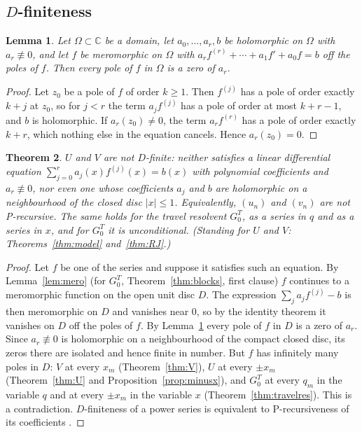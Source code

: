 \documentclass[11pt]{article}
\theoremstyle{plain}
\newtheorem{theorem}{Theorem}
\newtheorem{lemma}[theorem]{Lemma}
\theoremstyle{definition}
\theoremstyle{remark}
\newcommand{\C}{\mathbb{C}}
\begin{document}
\subsection{\texorpdfstring{$D$}{D}-finiteness}

\begin{lemma}\label{lem:odeposes}
Let $\Omega\subset\C$ be a domain, let $a_0,\dots,a_r,b$ be holomorphic on $\Omega$ with
$a_r\not\equiv0$, and let $f$ be meromorphic on $\Omega$ with
$a_rf^{(r)}+\cdots+a_1f'+a_0f=b$ off the poles of $f$. Then every pole of $f$ in $\Omega$ is a zero
of $a_r$.
\end{lemma}

\begin{proof}
Let $z_0$ be a pole of $f$ of order $k\ge1$. Then $f^{(j)}$ has a pole of order exactly $k+j$ at
$z_0$, so for $j<r$ the term $a_jf^{(j)}$ has a pole of order at most $k+r-1$, and $b$ is
holomorphic. If $a_r(z_0)\ne0$, the term $a_rf^{(r)}$ has a pole of order exactly $k+r$, which
nothing else in the equation cancels. Hence $a_r(z_0)=0$.
\end{proof}

\begin{theorem}\label{thm:nonDfinite}
$U$ and $V$ are not $D$-finite: neither satisfies a linear differential equation
$\sum_{j=0}^ra_j(x)f^{(j)}(x)=b(x)$ with polynomial coefficients and $a_r\not\equiv0$, nor even one
whose coefficients $a_j$ and $b$ are holomorphic on a neighbourhood of the closed disc $|x|\le1$.
Equivalently, $(u_n)$ and $(v_n)$ are not P-recursive. The same holds for the travel resolvent
$G^T_0$, as a series in $q$ and as a series in $x$, and for $G^T_0$ it is unconditional.
\textup{(}Standing for $U$ and $V$: Theorems~\ref{thm:model} and~\ref{thm:RJ}.\textup{)}
\end{theorem}

\begin{proof}
Let $f$ be one of the series and suppose it satisfies such an equation. By Lemma~\ref{lem:mero}
(for $G^T_0$, Theorem~\ref{thm:blocks}, first clause) $f$ continues to a meromorphic function on the
open unit disc $D$. The expression $\sum_ja_jf^{(j)}-b$ is then meromorphic on $D$ and vanishes near
$0$, so by the identity theorem it vanishes on $D$ off the poles of $f$. By
Lemma~\ref{lem:odeposes} every pole of $f$ in $D$ is a zero of $a_r$. Since $a_r\not\equiv0$ is
holomorphic on a neighbourhood of the compact closed disc, its zeros there are isolated and hence
finite in number. But $f$ has infinitely many poles in $D$: $V$ at every $x_m$
(Theorem~\ref{thm:V}), $U$ at every $\pm x_m$ (Theorem~\ref{thm:U} and
Proposition~\ref{prop:minusx}), and $G^T_0$ at every $q_m$ in the variable $q$ and at every $\pm x_m$
in the variable $x$ (Theorem~\ref{thm:travelres}). This is a contradiction. $D$-finiteness of a
power series is equivalent to P-recursiveness of its coefficients \cite[\S6.4]{StanleyEC2}.
\end{proof}
\end{document}
